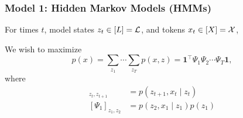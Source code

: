 \documentclass{beamer}
\begin{document}
\begin{frame}
\frametitle{Model 1: Hidden Markov Models (HMMs)}

For times $t$, model states $z_t \in [L] = \mathcal{L}$, and tokens $x_t \in [X] = \mathcal{X}$,

\vspace{1em}

\begin{center}
\end{center}

We wish to maximize
\begin{equation*}
p(x)
= \sum_{z_1}\cdots\sum_{z_T}p(x, z)
= \bm1^\top\Psi_1\Psi_2\cdots\Psi_T\bm1,
\end{equation*}
where
\begin{align*}
[\Psi_{t}]_{z_t,z_{t+1}} &= p(z_{t+1},x_t \mid z_t)\\
[\Psi_{1}]_{z_1,z_2} &= p(z_2,x_1 \mid z_1)p(z_1)
\end{align*}
\end{frame}

\end{document}
